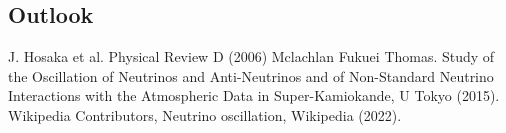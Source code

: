 \documentclass[12pt]{article}
\begin{document}
\begin{multicols}{2}

\section{Outlook}


\begin{thebibliography}{1}

	
     J. Hosaka et al. Physical Review D (2006)
     Mclachlan Fukuei Thomas. Study of the Oscillation of Neutrinos and Anti-Neutrinos and of Non-Standard Neutrino Interactions with the Atmospheric Data in Super-Kamiokande, U Tokyo (2015).
     Wikipedia Contributors, Neutrino oscillation, Wikipedia (2022).
        
    
\end{thebibliography}

    
\end{multicols}
\end{document}
